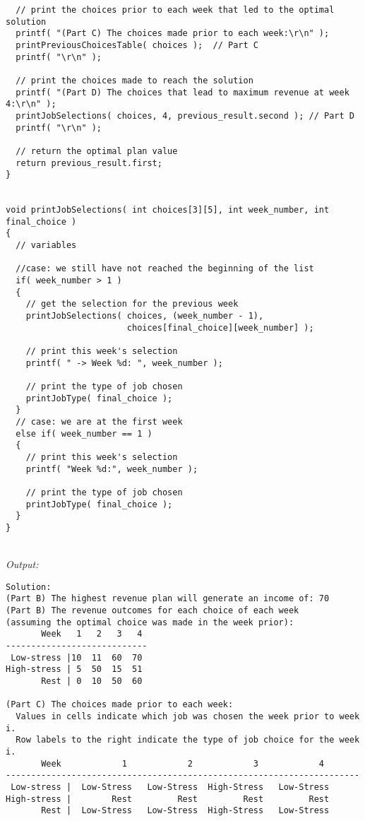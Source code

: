 \documentclass[11pts]{article}
\begin{document}
\begin{enumerate}
\begin{enumerate}
\begin{verbatim}
  // print the choices prior to each week that led to the optimal solution
  printf( "(Part C) The choices made prior to each week:\r\n" );
  printPreviousChoicesTable( choices );  // Part C
  printf( "\r\n" );

  // print the choices made to reach the solution
  printf( "(Part D) The choices that lead to maximum revenue at week 4:\r\n" );
  printJobSelections( choices, 4, previous_result.second ); // Part D
  printf( "\r\n" );

  // return the optimal plan value
  return previous_result.first;
}


void printJobSelections( int choices[3][5], int week_number, int final_choice )
{
  // variables

  //case: we still have not reached the beginning of the list
  if( week_number > 1 )
  {
    // get the selection for the previous week
    printJobSelections( choices, (week_number - 1),
                        choices[final_choice][week_number] );

    // print this week's selection
    printf( " -> Week %d: ", week_number );

    // print the type of job chosen
    printJobType( final_choice );
  }
  // case: we are at the first week
  else if( week_number == 1 )
  {
    // print this week's selection
    printf( "Week %d:", week_number );

    // print the type of job chosen
    printJobType( final_choice );
  }
}
  \end{verbatim} \\

  \textit{Output:} \\
  \begin{verbatim}
Solution: 
(Part B) The highest revenue plan will generate an income of: 70
(Part B) The revenue outcomes for each choice of each week
(assuming the optimal choice was made in the week prior):
       Week   1   2   3   4  
----------------------------
 Low-stress |10  11  60  70  
High-stress | 5  50  15  51  
       Rest | 0  10  50  60  

(Part C) The choices made prior to each week:
  Values in cells indicate which job was chosen the week prior to week i.
  Row labels to the right indicate the type of job choice for the week i.
       Week            1            2            3            4  
----------------------------------------------------------------------
 Low-stress |  Low-Stress   Low-Stress  High-Stress   Low-Stress 
High-stress |        Rest         Rest         Rest         Rest 
       Rest |  Low-Stress   Low-Stress  High-Stress   Low-Stress 


\end{verbatim}
\end{enumerate}
\end{enumerate}
\end{document}
